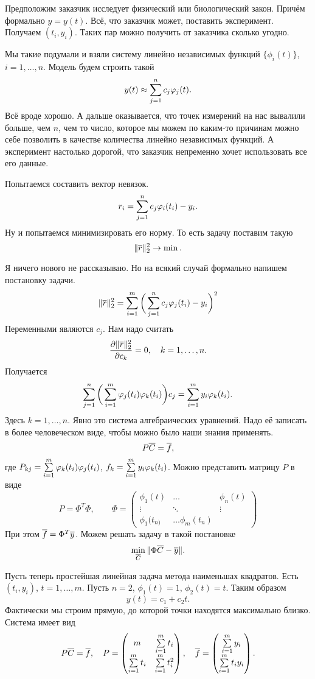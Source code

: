 Предположим заказчик исследует физический или биологический закон. Причём формально $y=y(t)$. Всё, что заказчик может, поставить эксперимент. Получаем $(t_i,y_i)$. Таких пар можно получить от заказчика сколько угодно.

Мы такие подумали и взяли систему линейно независимых функций $\big\{\phi_i(t)\big\}$, $i=1,\dots,n$. Модель будем строить такой
\[
  y(t)\approx \sum\limits_{j = 1}^{n} c_j \varphi_j(t).
\]
Всё вроде хорошо. А дальше оказывается, что точек измерений на нас вывалили больше, чем $n$, чем то число, которое мы можем по каким-то причинам можно себе позволить в качестве количества линейно независимых функций. А эксперимент настолько дорогой, что заказчик непременно хочет использовать все его данные.

Попытаемся составить вектор невязок.
\[
  r_i = \sum\limits_{j = 1}^{n} c_j \varphi_i(t_i) - y_i.
\]
Ну и попытаемся минимизировать его норму. То есть задачу поставим такую
\[
  \|\overline{r}\|_2^2 \rightarrow \min.
\]

Я ничего нового не рассказываю. Но на всякий случай формально напишем постановку задачи.
\[
  \|\overline{r}\|^2_2 = \sum\limits_{i = 1}^{m}\bigg(\sum\limits_{j = 1}^{n} c_j\varphi_j(t_i) - y_i\bigg)^2
\]
Переменными являются $c_j$. Нам надо считать
\[
  \frac{\partial \|\overline{r}\|^2_2}{\partial c_k} = 0,\quad k=1,\dots,n.
\] 
Получается
\[
 \sum\limits_{j = 1}^{n}\bigg(\sum\limits_{i = 1}^{m}\varphi_j(t_i)\varphi_k(t_i)\bigg)c_j = \sum\limits_{i = 1}^{m} y_i\varphi_k(t_i). 
\]
Здесь $k=1,\dots,n$. Явно это система алгебраических уравнений. Надо её записать в более человеческом виде, чтобы можно было наши знания применять.
\[
 P\overline{C} = \overline{f},
\]
где $P_{kj} = \sum\limits_{i = 1}^{m}\varphi_k(t_i) \varphi_j(t_i)$, $f_k = \sum\limits_{i = 1}^{m} y_i\varphi_k(t_i)$. Можно представить матрицу $P$  в виде
\[
  P = \Phi^T\Phi,\qquad
  \Phi = \begin{pmatrix}
\phi_1(t) & \dots & \phi_n(t) \\
\vdots & \ddots & \vdots \\
\phi_1(t_{n)} & \dots \phi_m(t_n)
\end{pmatrix}
\]
При этом $\overline{f} = \Phi^T\overline{y}$. Можем решать задачу в такой постановке
\[
  \min\limits_{\overline{C}} \|\Phi \overline{C} - \overline{y}\|.
\]

Пусть теперь простейшая линейная задача метода наименьшах квадратов. Есть $(t_i,y_i)$, $t=1,\dots,m$. Пусть $n=2$, $\phi_1(t) = 1$, $\phi_2(t) = t$. Таким образом
\[
  y(t) =c_1 + c_2 t.
\]
Фактически мы строим прямую, до которой точки находятся максимально близко. Система имеет вид
\[
  P\overline{C} = \overline{f},\quad
  P = \begin{pmatrix}
  m & \sum\limits_{i = 1}^{m} t_i\\
\sum\limits_{i = 1}^{m} t_i & \sum\limits_{i = 1}^{m} t_i^2
\end{pmatrix},\quad
\overline{f} = \begin{pmatrix}
\sum\limits_{i = 1}^{m} y_i\\
\sum\limits_{i = 1}^{m} t_iy_i
\end{pmatrix}.
\]

